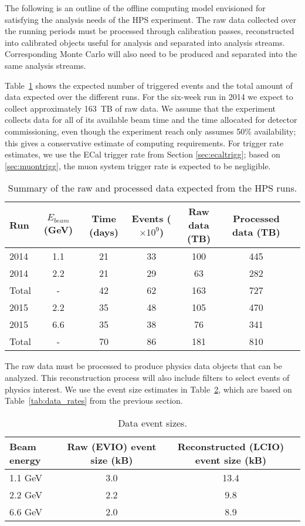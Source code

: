 
The following is an outline of the offline computing model envisioned for satisfying the analysis needs of the HPS experiment. The raw data collected over the running periods must be processed through calibration passes, reconstructed into calibrated objects useful for analysis and separated into analysis streams. Corresponding Monte Carlo will also need to be produced and separated into the same analysis streams.

Table~\ref{tab:data_volume} shows the expected number of triggered events and
the total amount of data expected over the 
different runs. For the six-week run in 2014 we expect to collect approximately 163~TB of raw data. 
We assume that the experiment collects data for all of its available beam time and the time allocated for detector commissioning, even though the experiment reach only assumes 50\% availability; this gives a conservative estimate of computing requirements. 
For trigger rate estimates, we use the ECal trigger rate from Section \ref{sec:ecaltrigg}; based on \ref{sec:muontrigg}, the muon system trigger rate is expected to be negligible.
\begin{table}[]
\centering
\begin{tabular}{|l|c|c|c|c|c|c|}
\hline
Run & $E_{beam}$ (GeV) & Time (days) & Events ($\times 10^9$) & Raw data (TB) & Processed data (TB)\\
\hline
2014 & 1.1 & 21 & 33 & 100 & 445 \\
2014 & 2.2 & 21 & 29 & 63 & 282  \\
\hline
Total & - & 42 & 62 & 163 & 727 \\
\hline
2015 & 2.2 & 35 & 48 & 105 & 470 \\
2015 & 6.6 & 35 & 38 & 76 & 341 \\
\hline
Total & - & 70 & 86 & 181 & 810 \\
\hline
\end{tabular}
\caption{{\small Summary of the raw and processed data expected from the HPS runs. }}
\label{tab:data_volume}
\end{table}

The raw data must be processed to produce physics data objects that can be analyzed. This reconstruction process will also include filters to select events of physics interest. We use the event size estimates 
in Table~\ref{tab:raw_data_size}, which are based on Table~\ref{tab:data_rates} from the previous section. 
\begin{table}[]
\centering
\begin{tabular}{|l|c|c|}
\hline
Beam energy & Raw (EVIO) event size (kB) & Reconstructed (LCIO) event size (kB) \\ 
\hline
1.1 GeV  &  3.0 & 13.4 \\
2.2 GeV  &  2.2 & 9.8 \\
6.6 GeV  &  2.0 & 8.9 \\
\hline
\end{tabular}
\caption{{\small Data event sizes. }}
\label{tab:raw_data_size}
\end{table}


